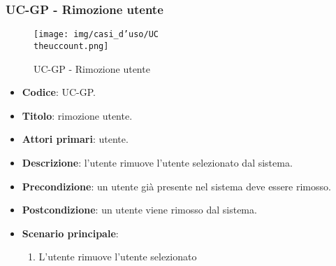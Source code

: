 \subsubsection{UC\theuccount-GP - Rimozione utente}
		\begin{figure}[H]
			\centering
				\texttt{[image: img/casi\_d'uso/UC\\theuccount.png]}\\
			\caption{UC\theuccount-GP - Rimozione utente}
		\end{figure}
	\begin{itemize}
		\item \textbf{Codice}: UC\theuccount-GP.
		\item \textbf{Titolo}: rimozione utente.
		\item \textbf{Attori primari}: utente.
		\item \textbf{Descrizione}: l'utente rimuove l'utente selezionato dal sistema.
		\item \textbf{Precondizione}: un utente già presente nel sistema deve essere rimosso.
		\item \textbf{Postcondizione}: un utente viene rimosso dal sistema.
		\item \textbf{Scenario principale}:
		\begin{enumerate}
			\item L'utente rimuove l'utente selezionato
		\end{enumerate}
\end{itemize}

